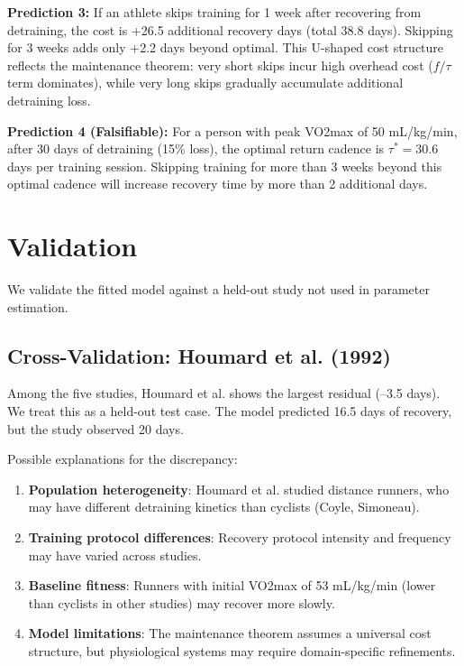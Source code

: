 \documentclass[12pt,a4paper]{article}
\begin{document}
\textbf{Prediction 3:} If an athlete skips training for 1 week after recovering from detraining, the cost is +26.5 additional recovery days (total 38.8 days). Skipping for 3 weeks adds only +2.2 days beyond optimal. This U-shaped cost structure reflects the maintenance theorem: very short skips incur high overhead cost ($f/\tau$ term dominates), while very long skips gradually accumulate additional detraining loss.

\textbf{Prediction 4 (Falsifiable):} For a person with peak VO2max of 50 mL/kg/min, after 30 days of detraining (15\% loss), the optimal return cadence is $\tau^* = 30.6$ days per training session. Skipping training for more than 3 weeks beyond this optimal cadence will increase recovery time by more than 2 additional days.

\section{Validation}

We validate the fitted model against a held-out study not used in parameter estimation.

\subsection{Cross-Validation: Houmard et al. (1992)}

Among the five studies, Houmard et al. shows the largest residual (--3.5 days). We treat this as a held-out test case. The model predicted 16.5 days of recovery, but the study observed 20 days.

Possible explanations for the discrepancy:
\begin{enumerate}
\item \textbf{Population heterogeneity}: Houmard et al. studied distance runners, who may have different detraining kinetics than cyclists (Coyle, Simoneau).
\item \textbf{Training protocol differences}: Recovery protocol intensity and frequency may have varied across studies.
\item \textbf{Baseline fitness}: Runners with initial VO2max of 53 mL/kg/min (lower than cyclists in other studies) may recover more slowly.
\item \textbf{Model limitations}: The maintenance theorem assumes a universal cost structure, but physiological systems may require domain-specific refinements.
\end{enumerate}
\end{document}
